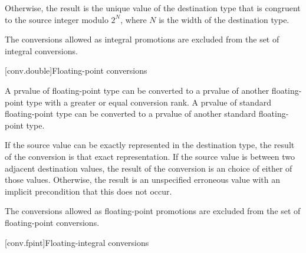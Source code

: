 \pnum
{}%
%
Otherwise, the result is the unique value of the destination type
that is congruent to the source integer modulo $2^N$,
where $N$ is the width of the destination type.

\pnum
The conversions allowed as integral promotions are excluded from the set
of integral conversions.

[conv.double]{Floating-point conversions}

\pnum
{}%
A prvalue of floating-point type can be converted to a prvalue of
another floating-point type
with a greater or equal conversion rank.
A prvalue of standard floating-point type can be converted to
a prvalue of another standard floating-point type.

\pnum
If the source value can be exactly
represented in the destination type, the result of the conversion is
that exact representation. If the source value is between two adjacent
destination values, the result of the conversion is an
 choice of either of those values.
Otherwise, the result is an unspecified erroneous value
with an implicit precondition that this does not occur.
%
%
%
%
%

\pnum
The conversions allowed as floating-point promotions are excluded from
the set of floating-point conversions.

[conv.fpint]{Floating-integral conversions}

